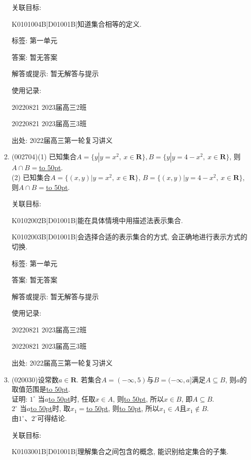 \documentclass[10pt,a4paper]{article}
\newcommand{\blank}[1]{\underline{\hbox to #1pt{}}}
\begin{document}
\begin{enumerate}[1.]
关联目标:

K0101004B|D01001B|知道集合相等的定义.



标签: 第一单元

答案: 暂无答案

解答或提示: 暂无解答与提示

使用记录:

20220821	2023届高三2班	

20220821	2023届高三3班	


出处: 2022届高三第一轮复习讲义
\item { (002704)}(1) 已知集合$A=\{y|y=x^2, \ x\in \mathbf{R}\}, B=\{y|y=4-x^2, \ x\in \mathbf{R}\}$, 则$A\cap B=$\blank{50}.\\
(2) 已知集合$A=\{(x,y)|y={x^2},\ x\in \mathbf{R}\}$, $B=\{(x,y)|y=4-x^2, \ x\in \mathbf{R}\}$, 则$A\cap B=$\blank{50}.


关联目标:

K0102002B|D01001B|能在具体情境中用描述法表示集合.

K0102003B|D01001B|会选择合适的表示集合的方式, 会正确地进行表示方式的切换.



标签: 第一单元

答案: 暂无答案

解答或提示: 暂无解答与提示

使用记录:

20220821	2023届高三2班		

20220821	2023届高三3班		


出处: 2022届高三第一轮复习讲义
\item { (020030)}设常数$a\in \mathbf{R}$. 若集合$A=(-\infty ,5)$与$B=(-\infty ,a]$满足$A\subseteq B$, 则$a$的取值范围是\blank{50}.\\
证明: $1^\circ$ 当$a$\blank{50}时, 任取$x\in A$, 则\blank{50}, 所以$x\in B$, 即$A\subseteq B$.\\ 
$2^\circ$ 当$a$\blank{50}时, 取$x_1=$\blank{50}, 则\blank{50}, 所以$x_1\in A$且$x_1\not \in B$.\\
由$1^\circ$、$2^\circ$可得结论.


关联目标:

K0103001B|D01001B|理解集合之间包含的概念, 能识别给定集合的子集.




\end{enumerate}
\end{document}
